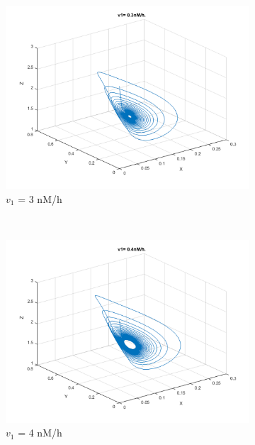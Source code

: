 \documentclass[10pt,a4paper,oneside,twocolumn]{article}
\numberwithin{equation}{section} %
\begin{document}
\begin{figure}
	\begin{subfigure}[b]{0.32\textwidth}
	    \includegraphics[width=\textwidth]{LotsofthesameA/A-AA3.png}
	    \caption{$v_1$ = 3 nM/h}
	\end{subfigure}
	~ 
	\begin{subfigure}[b]{0.32\textwidth}
	    \includegraphics[width=\textwidth]{LotsofthesameA/A-AA4.png}
	    \caption{$v_1$ = 4 nM/h}
	\end{subfigure}
	~
	\begin{subfigure}[b]{0.32\textwidth}

\end{subfigure}
\end{figure}
\end{document}
